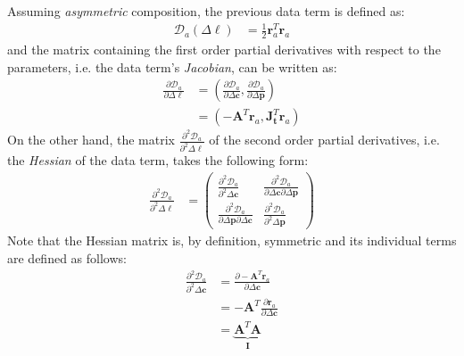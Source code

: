 Assuming \emph{asymmetric} composition, the previous data term is defined as:
\begin{equation}
    \begin{aligned}
		\mathcal{D}_a(\Delta \boldsymbol{\ell}) & = \frac{1}{2}\mathbf{r}_a^T \mathbf{r}_a
    \label{eq:asymmetric_data}
    \end{aligned}
\end{equation}
and the matrix containing the first order partial derivatives with respect to the parameters, i.e. the data term's \emph{Jacobian}, can be written as:
\begin{equation}
    \begin{aligned}
		\frac{\partial \mathcal{D}_a}{\partial \Delta \boldsymbol{\ell}} & = \left( \frac{\partial \mathcal{D}_a}{\partial \Delta \mathbf{c}}, \frac{\partial \mathcal{D}_a}{\partial \Delta \mathbf{p}} \right)
		\\
		& = \left( -\mathbf{A}^T \mathbf{r}_a, \mathbf{J}_{\mathbf{t}}^T \mathbf{r}_a \right)
    \label{eq:asymmetric_newton_jacobian}
    \end{aligned}
\end{equation}
On the other hand, the matrix $\frac{\partial^2 \mathcal{D}_a}{\partial^2 \Delta \boldsymbol{\ell}}$ of the second order partial derivatives, i.e. the \emph{Hessian} of the data term, takes the following form:
\begin{equation}
    \begin{aligned}
		\frac{\partial^2 \mathcal{D}_a}{\partial^2 \Delta \boldsymbol{\ell}} & =
		\begin{pmatrix}
			\frac{\partial^2 \mathcal{D}_a}{\partial^2 \Delta \mathbf{c}} & \frac{\partial^2 \mathcal{D}_a}{\partial \Delta \mathbf{c} \partial \Delta \mathbf{p}}
			\\
			\frac{\partial^2 \mathcal{D}_a}{\partial \Delta \mathbf{p} \partial \Delta \mathbf{c}} & \frac{\partial^2 \mathcal{D}_a}{\partial^2 \Delta \mathbf{p}}
		\end{pmatrix}
    \label{eq:asymmetric_newton_hessian}
    \end{aligned}
\end{equation}
Note that the Hessian matrix is, by definition, symmetric and its individual terms are defined as follows:
\begin{equation}
    \begin{aligned}
		\frac{\partial^2 \mathcal{D}_a}{\partial^2 \Delta \mathbf{c}} & = \frac{\partial -\mathbf{A}^T \mathbf{r}_a}{\partial \Delta \mathbf{c}}
		\\
		& = -\mathbf{A}^T \frac{\partial \mathbf{r}_a}{\partial \Delta \mathbf{c}}
		\\
		& = \underbrace{\mathbf{A}^T \mathbf{A}}_{\mathbf{I}}
    \label{eq:asymmetric_hessian_term1}
    \end{aligned}
\end{equation}
